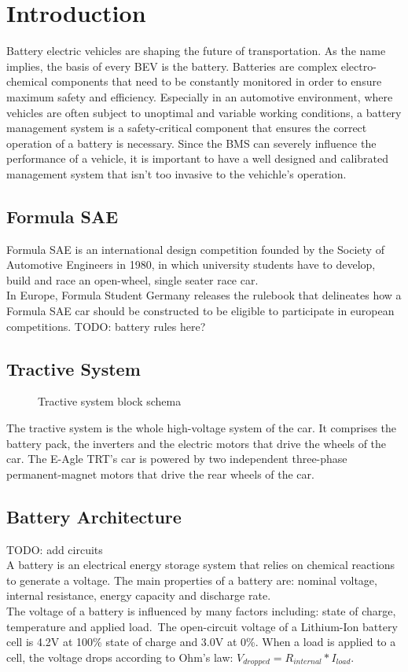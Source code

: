 \chapter{Introduction}
\label{cha:intro}
Battery electric vehicles are shaping the future of transportation. As the name implies, the basis of every BEV is the battery. Batteries are complex electro-chemical components that need to be constantly monitored in order to ensure maximum safety and efficiency. Especially in an automotive environment, where vehicles are often subject to unoptimal and variable working conditions, a battery management system is a safety-critical component that ensures the correct operation of a battery is necessary. Since the BMS can severely influence the performance of a vehicle, it is important to have a well designed and calibrated management system that isn't too invasive to the vehichle's operation.

\section{Formula SAE}
Formula SAE is an international design competition founded by the Society of Automotive Engineers in 1980, in which university students have to develop, build and race an open-wheel, single seater race car.\\
In Europe, Formula Student Germany releases the rulebook \cite{fsg2020} that delineates how a Formula SAE car should be constructed to be eligible to participate in european competitions.
TODO: battery rules here?\\

\section{Tractive System}
\begin{figure}[h]
    \centering
    
    \caption{Tractive system block schema}
    \label{fig:tractive_system}
\end{figure}

The tractive system is the whole high-voltage system of the car. It comprises the battery pack, the inverters and the electric motors that drive the wheels of the car.
The E-Agle TRT's car is powered by two independent three-phase permanent-magnet motors that drive the rear wheels of the car.

\section{Battery Architecture}
TODO: add circuits\\
A battery is an electrical energy storage system that relies on chemical reactions to generate a voltage. The main properties of a battery are: nominal voltage, internal resistance, energy capacity and discharge rate.\\
The voltage of a battery is influenced by many factors including: state of charge, temperature and applied load.\ The open-circuit voltage of a Lithium-Ion battery cell is 4.2V at 100\% state of charge and 3.0V at 0\%.
When a load is applied to a cell, the voltage drops according to Ohm's law: $V_{dropped} = R_{internal}*I_{load}$.

